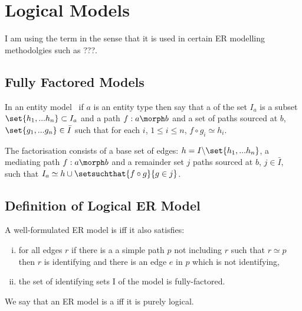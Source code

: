 
\section{Logical Models}
I am using the term  in the sense that it is used in certain ER modelling methodolgies such as ???.
\subsection{Fully Factored Models}

\begin{definition}
In an entity model \genericmodel\ if $a$ is an entity type then say that
a  of the set $I_a$ is a subset $\set{h_1,...h_n} \subset I_a$
and a  path $f:a \morph b$ and a set of paths sourced at $b$, $\set{g_1,...g_n} \in \bar{I}$
such that for each $i$, $1 \leq i \leq n$, $f \circ g_i \simeq h_i$. 
\end{definition}

The factorisation consists  
of a base set of edges: $h=I \backslash \set{h_1,...h_n}$, a mediating path $f:a \morph b$ and a remainder 
set $j$ paths sourced at $b$, $j \in \bar{I}$, 
such that $I_a \simeq h \cup \setsuchthat{f\circ g}{g \in j}$.


\subsection{Definition of Logical ER Model}
\begin{definition}
A well-formulated ER model is   iff it 
also satisfies:
\begin{enumerate}[(i)]
\item
for all edges $r$ if there is a
a simple path $p$  not including $r$ such that
 $r \simeq p$  then $r$ is identifying and there is an edge $e$ in $p$ which is not identifying,
\item the set of identifying sets I of the model is fully-factored.
\end{enumerate} 
\end{definition}

\noindent
We say that an ER model is a  iff it is purely logical.

